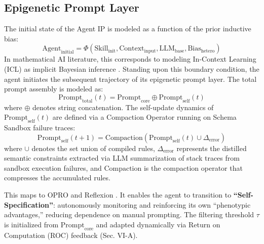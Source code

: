 \documentclass[10pt,journal,compsoc]{IEEEtran}
\begin{document}
\subsection{Epigenetic Prompt Layer}
The initial state of the Agent IP is modeled as a function of the prior inductive bias:
\begin{equation}
\text{Agent}_{\text{initial}} = \Phi(\text{Skill}_{\text{init}}, \text{Context}_{\text{input}}, \text{LLM}_{\text{base}}, \text{Bias}_{\text{hetero}})
\end{equation}
In mathematical AI literature, this corresponds to modeling In-Context Learning (ICL) as implicit Bayesian inference \cite{xie2021}. Standing upon this boundary condition, the agent initiates the subsequent trajectory of its epigenetic prompt layer.
The total prompt assembly is modeled as:
\begin{equation}
\text{Prompt}_{\text{total}}(t) = \text{Prompt}_{\text{core}} \oplus \text{Prompt}_{\text{self}}(t)
\end{equation}
where $\oplus$ denotes string concatenation.
The self-update dynamics of $\text{Prompt}_{\text{self}}(t)$ are defined via a Compaction Operator running on Schema Sandbox failure traces:
\begin{equation}
\text{Prompt}_{\text{self}}(t+1) = \text{Compaction}(\text{Prompt}_{\text{self}}(t) \cup \Delta_{\text{error}})
\end{equation}
where $\cup$ denotes the set union of compiled rules, $\Delta_{\text{error}}$ represents the distilled semantic constraints extracted via LLM summarization of stack traces from sandbox execution failures, and $\text{Compaction}$ is the compaction operator that compresses the accumulated rules.

This maps to OPRO \cite{yang2023} and Reflexion \cite{shinn2023}. It enables the agent to transition to \textbf{``Self-Specification''}: autonomously monitoring and reinforcing its own ``phenotypic advantages,'' reducing dependence on manual prompting. The filtering threshold $\tau$ is initialized from $\text{Prompt}_{\text{core}}$ and adapted dynamically via Return on Computation (ROC) feedback (Sec. VI-A).
\end{document}
